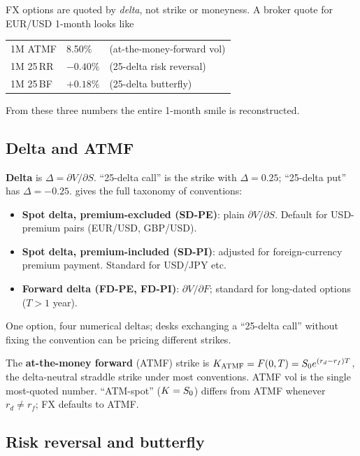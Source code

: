 FX options are quoted by \emph{delta}, not strike or moneyness.  A
broker quote for EUR/USD 1-month looks like
\begin{center}
\small
\begin{tabular}{@{}lll@{}}
\toprule
1M ATMF & 8.50\% & (at-the-money-forward vol) \\
1M 25\,RR & $-0.40\%$ & (25-delta risk reversal) \\
1M 25\,BF & $+0.18\%$ & (25-delta butterfly) \\
\bottomrule
\end{tabular}
\end{center}
From these three numbers the entire 1-month smile is reconstructed.

\subsection{Delta and ATMF}

\textbf{Delta} is $\Delta = \partial V / \partial S$.  ``25-delta
call'' is the strike with $\Delta = 0.25$; ``25-delta put'' has
$\Delta = -0.25$.  \citet{clark2011foreign} gives the full taxonomy
of conventions:
\begin{itemize}
  \item \textbf{Spot delta, premium-excluded (SD-PE)}: plain
    $\partial V / \partial S$.  Default for USD-premium pairs
    (EUR/USD, GBP/USD).
  \item \textbf{Spot delta, premium-included (SD-PI)}: adjusted
    for foreign-currency premium payment.  Standard for USD/JPY etc.
  \item \textbf{Forward delta (FD-PE, FD-PI)}: $\partial V/\partial
    F$; standard for long-dated options ($T > 1$ year).
\end{itemize}
One option, four numerical deltas; desks exchanging a ``25-delta
call'' without fixing the convention can be pricing different
strikes.

The \textbf{at-the-money forward} (ATMF) strike is
$K_{\mathrm{ATMF}} = F(0,T) = S_0 e^{(r_d - r_f)T}$, the
delta-neutral straddle strike under most conventions.  ATMF vol is
the single most-quoted number.  ``ATM-spot'' ($K = S_0$)
differs from ATMF whenever $r_d \neq r_f$; FX defaults to ATMF.

\subsection{Risk reversal and butterfly}

